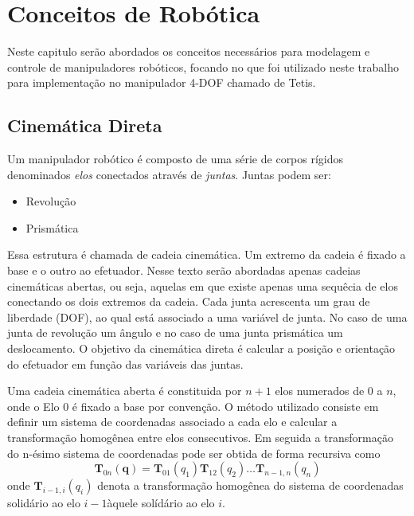 \chapter{Conceitos de Robótica}
Neste capitulo serão abordados os conceitos necessários para modelagem e controle de manipuladores robóticos, focando no que foi utilizado neste trabalho para implementação no manipulador 4-DOF chamado de Tetis.

\section{Cinemática Direta}
Um manipulador robótico é composto de uma série de corpos rígidos denominados \textit{elos} conectados através de \textit{juntas}. 
Juntas podem ser:
\begin{itemize} 
\item Revolução
\item Prismática
\end{itemize}

Essa estrutura é chamada de cadeia cinemática.
Um extremo da cadeia é fixado a base e o outro ao efetuador.
Nesse texto serão abordadas apenas cadeias cinemáticas abertas, ou seja, aquelas em que existe apenas uma sequêcia de elos conectando os dois extremos da cadeia.
Cada junta acrescenta um grau de liberdade (DOF), ao qual está associado a uma variável de junta. No caso de uma junta de revolução um ângulo e no caso de uma junta prismática um deslocamento.
O objetivo da cinemática direta é calcular a posição e orientação do efetuador em função das variáveis das juntas.


Uma cadeia cinemática aberta é constituida por $n+1$ elos numerados de $0$ a $n$, onde o Elo 0 é fixado a base por convenção. O método utilizado consiste em definir um sistema de coordenadas associado a cada elo e calcular a transformação homogênea entre elos consecutivos. Em seguida a transformação do n-ésimo sistema de coordenadas pode ser obtida de forma recursiva como
\begin{equation}\label{eq:cinedireta}
\bm{T}_{0n}(\bm{q}) = \bm{T}_{01}(q_1) \bm{T}_{12}(q_{2}) {\dots} \bm{T}_{n-1,n}(q_n)
\end{equation}
onde $\bm{T}_{i-1,i}(q_i)$ denota a transformação homogênea do sistema de coordenadas solidário ao elo $i-1$àquele solídário ao elo $i$.

